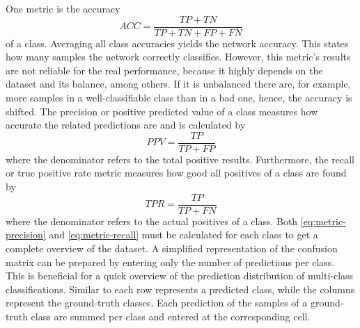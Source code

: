 One metric is the accuracy
\begin{equation}
	ACC = \frac{TP + TN}{TP + TN + FP + FN}
\end{equation}
of a class.
Averaging all class accuracies yields the network accuracy.
This states how many samples the network correctly classifies.
However, this metric's results are not reliable for the real performance, because it highly depends on the dataset and its balance, among others.
If it is unbalanced there are, for example, more samples in a well-classifiable class than in a bad one, hence, the accuracy is shifted.
The precision or positive predicted value of a class measures how accurate the related predictions are and is calculated by
\begin{equation}
	\label{eq:metric-precision}
	PPV = \frac{TP}{TP + FP}
\end{equation}
where the denominator refers to the total positive results.
Furthermore, the recall or true positive rate metric measures how good all positives of a class are found by
\begin{equation}
	\label{eq:metric-recall}
	TPR = \frac{TP}{TP + FN}
\end{equation}
where the denominator refers to the actual positives of a class.
Both \eqref{eq:metric-precision} and \eqref{eq:metric-recall} must be calculated for each class to get a complete overview of the dataset.
A simplified representation of the confusion matrix can be prepared by entering only the number of predictions per class.
This is beneficial for a quick overview of the prediction distribution of multi-class classifications.
Similar to  each row represents a predicted class, while the columns represent the ground-truth classes.
Each prediction of the samples of a ground-truth class are summed per class and entered at the corresponding cell.